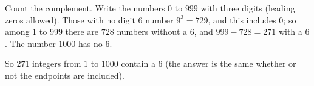 Count the complement. Write the numbers $0$ to $999$ with three digits (leading zeros allowed). Those with no digit $6$ number $9^3=729$, and this includes $0$; so among $1$ to $999$ there are $728$ numbers without a $6$, and $999-728=271$ with a $6$. The number $1000$ has no $6$.

So $\boxed{271}$ integers from $1$ to $1000$ contain a $6$ (the answer is the same whether or not the endpoints are included).
